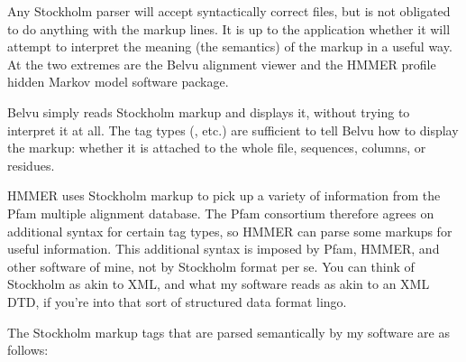Any Stockholm parser will accept syntactically correct files, but is
not obligated to do anything with the markup lines. It is up to the
application whether it will attempt to interpret the meaning (the
semantics) of the markup in a useful way. At the two extremes are the
Belvu alignment viewer and the HMMER profile hidden Markov model
software package.

Belvu simply reads Stockholm markup and displays it, without trying to
interpret it at all. The tag types (, etc.) are sufficient
to tell Belvu how to display the markup: whether it is attached to the
whole file, sequences, columns, or residues.

HMMER uses Stockholm markup to pick up a variety of information from
the Pfam multiple alignment database. The Pfam consortium therefore
agrees on additional syntax for certain tag types, so HMMER can parse
some markups for useful information. This additional syntax is imposed
by Pfam, HMMER, and other software of mine, not by Stockholm format
per se. You can think of Stockholm as akin to XML, and what my
software reads as akin to an XML DTD, if you're into that sort of
structured data format lingo.

The Stockholm markup tags that are parsed semantically by my software
are as follows:

